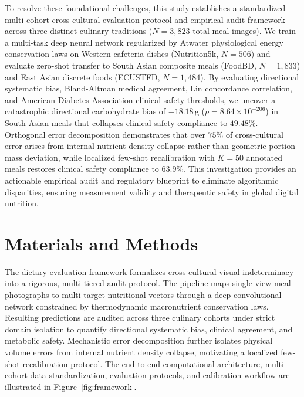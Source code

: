 \documentclass[utf8]{FrontiersinVancouver}
\begin{document}
To resolve these foundational challenges, this study establishes a standardized multi-cohort cross-cultural evaluation protocol and empirical audit framework across three distinct culinary traditions ($N=3,823$ total meal images). We train a multi-task deep neural network regularized by Atwater physiological energy conservation laws on Western cafeteria dishes (Nutrition5k, $N=506$) and evaluate zero-shot transfer to South Asian composite meals (FoodBD, $N=1,833$) and East Asian discrete foods (ECUSTFD, $N=1,484$). By evaluating directional systematic bias, Bland-Altman medical agreement, Lin concordance correlation, and American Diabetes Association clinical safety thresholds, we uncover a catastrophic directional carbohydrate bias of $-18.18$\,g ($p = 8.64 \times 10^{-206}$) in South Asian meals that collapses clinical safety compliance to $49.48\%$. Orthogonal error decomposition demonstrates that over $75\%$ of cross-cultural error arises from internal nutrient density collapse rather than geometric portion mass deviation, while localized few-shot recalibration with $K=50$ annotated meals restores clinical safety compliance to $63.9\%$. This investigation provides an actionable empirical audit and regulatory blueprint to eliminate algorithmic disparities, ensuring measurement validity and therapeutic safety in global digital nutrition.

\section{Materials and Methods}

The dietary evaluation framework formalizes cross-cultural visual indeterminacy into a rigorous, multi-tiered audit protocol. The pipeline maps single-view meal photographs to multi-target nutritional vectors through a deep convolutional network constrained by thermodynamic macronutrient conservation laws. Resulting predictions are audited across three culinary cohorts under strict domain isolation to quantify directional systematic bias, clinical agreement, and metabolic safety. Mechanistic error decomposition further isolates physical volume errors from internal nutrient density collapse, motivating a localized few-shot recalibration protocol. The end-to-end computational architecture, multi-cohort data standardization, evaluation protocols, and calibration workflow are illustrated in Figure~\ref{fig:framework}.
\end{document}
